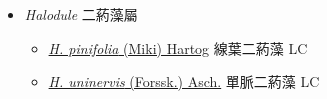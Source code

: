 
  \begin{itemize}
 \item[] \textit{Halodule} 二葯藻屬
                                
  \begin{itemize}
        \item[] \href{http://www.theplantlist.org/tpl1.1/search?q=Halodule+pinifolia}{\textit{H. pinifolia} (Miki) Hartog}   線葉二葯藻   LC
        \item[] \href{http://www.theplantlist.org/tpl1.1/search?q=Halodule+uninervis}{\textit{H. uninervis} (Forssk.) Asch.}   單脈二葯藻   LC
  \end{itemize}
  \end{itemize}
